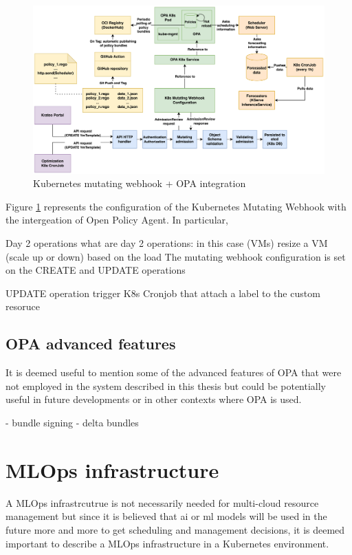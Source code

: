 \begin{figure}[htb]
\centering
\includegraphics[width=1\linewidth]{images/mutating_webhook+OPA_integration.png}
\caption{Kubernetes mutating webhook + OPA integration}
\label{fig:webhook+opa}
\end{figure}

Figure \ref{fig:webhook+opa} represents the configuration of the Kubernetes Mutating Webhook with the intergeation of Open Policy Agent.
In particular, 




Day 2 operations
what are day 2 operations: in this case (VMs) resize a VM (scale up or down) based on the load
The mutating webhook configuration is set on the CREATE and UPDATE operations

UPDATE operation trigger
K8s Cronjob that attach a label to the custom resoruce 

\subsection{OPA advanced features}

It is deemed useful to mention some of the advanced features of OPA that were not employed in the system described in this thesis but could be potentially useful in future developments or in other contexts where OPA is used.

- bundle signing
- delta bundles

\newpage

\section{MLOps infrastructure}

A MLOps infrastrcutrue is not necessarily needed for multi-cloud resource management but since it is believed that ai or ml models will be used in the future more and more to get scheduling and management decisions, it is deemed important to describe a MLOps infrastructure in a Kubernetes environment.

